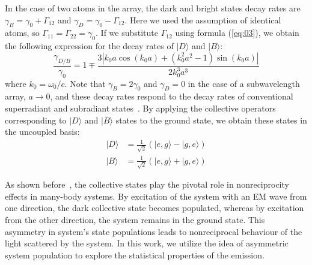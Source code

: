 \documentclass[aps,prl,twocolumn,superscriptaddress,showpacs,amsmath,amssymb]{revtex4-2}
\begin{document}
In the case of two atoms in the array, the dark and bright states decay rates are $\gamma_{B} = \gamma_0 + \Gamma_{12}$ and $\gamma_{D} = \gamma_0 - \Gamma_{12}$. 
Here we used the assumption of identical atoms, so $\Gamma_{11} = \Gamma_{22} = \gamma_0$. 
If we substitute $\Gamma_{12}$ using formula (\ref{eq:03}), we obtain the following expression for the decay rates of $|D\rangle$ and $|B \rangle$:
\begin{equation}
\frac{\gamma_{D/B}}{\gamma_0} = 1 \mp \frac{3 \left| k_0 a \cos \left( k_0 a \right)+ \left(k_0^2 a^2 -1\right)\sin \left( k_0 a \right)\right| }{2 k_0^3 a^3}
    \label{eq:11}
\end{equation}
where $k_0 = \omega_0 / c$.
Note that $\gamma_B = 2 \gamma_0$ and $\gamma_D = 0$ in the case of a subwavelength array, $a \to 0$, and these decay rates respond to the decay rates of conventional superradiant and subradiant states~\cite{dicke1954coherence,nefedkin2017bad,nefedkin2017superradiance}.
By applying the collective operators corresponding to $|D\rangle$ and $|B \rangle$ states to the ground state, we obtain these states in the uncoupled basis:
\begin{align}
    \label{eq:11a}
    |D \rangle &= \frac{1}{\sqrt{2}} \left( |e,g\rangle - |g,e\rangle \right)\\
    \label{eq:11b}
    |B \rangle &= \frac{1}{\sqrt{2}} \left( |e,g\rangle + |g,e\rangle \right)
\end{align}

As shown before~\cite{muller2017nonreciprocal,hamann2018nonreciprocity, nefedkin2022dark, nefedkin2023nonreciprocal}, the collective states play the pivotal role in nonreciprocity effects in many-body systems. 
By excitation of the system with an EM wave from one direction, the dark collective state becomes populated, whereas by excitation from the other direction, the system remains in the ground state. 
This asymmetry in system's state populations leads to nonreciprocal behaviour of the light scattered by the system. 
In this work, we utilize the idea of asymmetric system population to explore the statistical properties of the emission.
\end{document}
